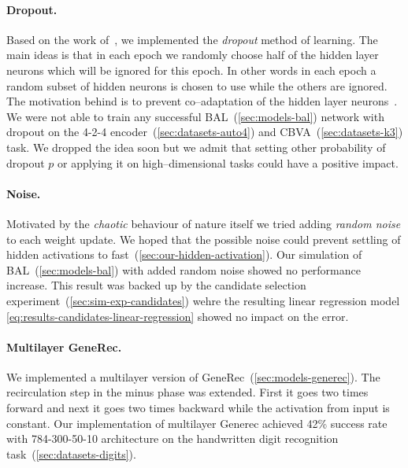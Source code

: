 \paragraph{Dropout.}
\label{sec:sim-our-dropout}
Based on the work of~\citet{hinton2012improving}, we implemented the \emph{dropout} method of learning. The main ideas is that in each epoch we randomly choose half of the hidden layer neurons which will be ignored for this epoch. In other words in each epoch a random subset of hidden neurons is chosen to use while the others are ignored. The motivation behind is to prevent co--adaptation of the hidden layer neurons~\citep{hinton2012improving}. We were not able to train any successful BAL~(\ref{sec:models-bal}) network with dropout on the 4-2-4 encoder~(\ref{sec:datasets-auto4}) and CBVA~(\ref{sec:datasets-k3}) task. We dropped the idea soon but we admit that setting other probability of dropout $p$ or applying it on high--dimensional tasks could have a positive impact. 

\paragraph{Noise.} 
\label{sec:sim-our-noise} 

Motivated by the \emph{chaotic} behaviour of nature itself we tried adding \emph{random noise} to each weight update. We hoped that the possible noise could prevent settling of hidden activations to fast~(\ref{sec:our-hidden-activation}). Our simulation of BAL~(\ref{sec:models-bal}) with added random noise showed no performance increase. This result was backed up by the candidate selection experiment~(\ref{sec:sim-exp-candidates}) wehre the resulting linear regression model \ref{eq:results-candidates-linear-regression} showed no impact on the error. 

\paragraph{Multilayer GeneRec.}
\label{sec:sim-our-generec-multi} 

We implemented a multilayer version of GeneRec~(\ref{sec:models-generec}). The recirculation step in the minus phase was extended. First it goes two times forward and next it goes two times backward while the activation from input is constant. Our implementation of multilayer Generec achieved 42\% success rate with 784-300-50-10 architecture on the handwritten digit recognition task~(\ref{sec:datasets-digits}). 
